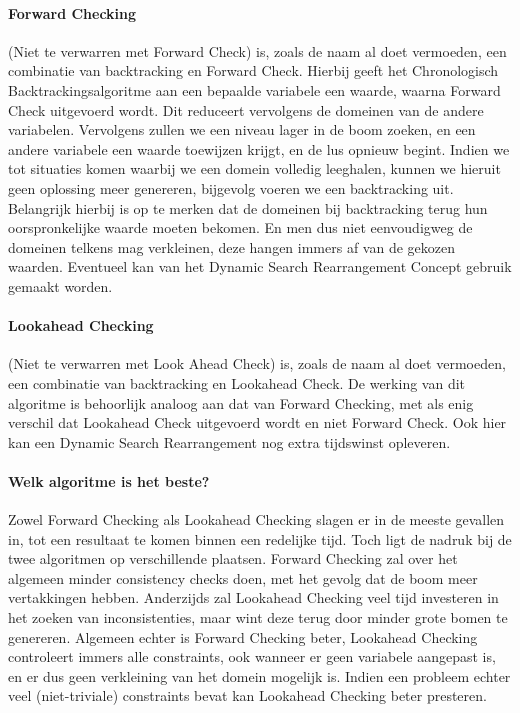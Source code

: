 \paragraph{Forward Checking} (Niet te verwarren met Forward Check) is, zoals de naam al doet vermoeden, een combinatie van backtracking en Forward Check. Hierbij geeft het Chronologisch Backtrackingsalgoritme aan een bepaalde variabele een waarde, waarna Forward Check uitgevoerd wordt. Dit reduceert vervolgens de domeinen van de andere variabelen. Vervolgens zullen we een niveau lager in de boom zoeken, en een andere variabele een waarde toewijzen krijgt, en de lus opnieuw begint. Indien we tot situaties komen waarbij we een domein volledig leeghalen, kunnen we hieruit geen oplossing meer genereren, bijgevolg voeren we een backtracking uit. Belangrijk hierbij is op te merken dat de domeinen bij backtracking terug hun oorspronkelijke waarde moeten bekomen. En men dus niet eenvoudigweg de domeinen telkens mag verkleinen, deze hangen immers af van de gekozen waarden. Eventueel kan van het Dynamic Search Rearrangement Concept gebruik gemaakt worden.
\paragraph{Lookahead Checking} (Niet te verwarren met Look Ahead Check) is, zoals de naam al doet vermoeden, een combinatie van backtracking en Lookahead Check. De werking van dit algoritme is behoorlijk analoog aan dat van Forward Checking, met als enig verschil dat Lookahead Check uitgevoerd wordt en niet Forward Check. Ook hier kan een Dynamic Search Rearrangement nog extra tijdswinst opleveren.
\paragraph{Welk algoritme is het beste?}
Zowel Forward Checking als Lookahead Checking slagen er in de meeste gevallen in, tot een resultaat te komen binnen een redelijke tijd. Toch ligt de nadruk bij de twee algoritmen op verschillende plaatsen. Forward Checking zal over het algemeen minder consistency checks doen, met het gevolg dat de boom meer vertakkingen hebben. Anderzijds zal Lookahead Checking veel tijd investeren in het zoeken van inconsistenties, maar wint deze terug door minder grote bomen te genereren. Algemeen echter is Forward Checking beter, Lookahead Checking controleert immers alle constraints, ook wanneer er geen variabele aangepast is, en er dus geen verkleining van het domein mogelijk is. Indien een probleem echter veel (niet-triviale) constraints bevat kan Lookahead Checking beter presteren.
